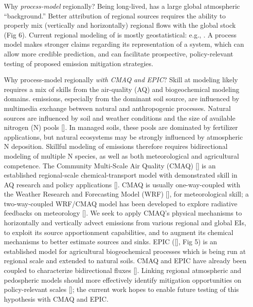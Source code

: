 \documentclass{a0poster} %
\begin{document}
\begin{textblock}{45}
        {\color{Red}Why \textit{process-model}  regionally?} Being long-lived,  has a large global atmospheric ``background.'' Better attribution of regional sources requires the ability to properly mix (vertically and horizontally) regional flows with the global stock (Fig 6). Current regional modeling of  is mostly geostatistical: e.g., \citet{miller_regional_2012}. A process model makes stronger claims regarding its representation of a system, which can allow more credible prediction, and can facilitate prospective, policy-relevant testing of proposed emission mitigation strategies.

        {\color{Red} Why process-model  regionally \textit{with CMAQ and EPIC}?} Skill at modeling  likely requires a mix of skills from the air-quality (AQ) and biogeochemical modeling domains.  emissions, especially from the dominant soil source, are influenced by multimedia exchange between natural and anthropogenic processes. Natural sources are influenced by soil and weather conditions and the size of available nitrogen (N) pools [\citet{smith_effects_1998}]. In managed soils, these pools are dominated by fertilizer applications, but natural ecosystems may be strongly influenced by atmospheric N deposition. Skillful modeling of  emissions therefore requires bidirectional modeling of multiple N species, as well as both meteorological and agricultural competence. The Community Multi-Scale Air Quality (CMAQ) [\citet{byun_review_2006}] is an established regional-scale chemical-transport model with demonstrated skill in AQ research and policy applications [\citet{foley_CMAQ_47_2010}]. CMAQ is usually one-way-coupled with the Weather Research and Forecasting Model (WRF) [\citet{skamarock_description_2005}], for meteorological skill; a two-way-coupled WRF/CMAQ model has been developed to explore radiative feedbacks on meteorology [\citet{wong_WRF_CMAQ_2012}]. We seek to apply CMAQ's physical mechanisms to horizontally and vertically advect  emissions from various regional and global EIs, to exploit its source apportionment capabilities, and to augment its chemical mechanisms to better estimate  sources and sinks. EPIC ([\citet{texas_agrilife_blackland_research_and_extension_center_epic_2011}], Fig 5) is an established model for agricultural biogeochemical processes which is being run at regional scale and extended to natural soils. CMAQ and EPIC have already been coupled to characterize bidirectional  fluxes [\citet{cooter_linking_2012}]. {\color{Red}Linking regional atmospheric and pedospheric models should more effectively identify  mitigation opportunities on policy-relevant scales} [\citet{olander_using_2011}]; the current work hopes to enable future testing of this hypothesis with CMAQ and EPIC.


\end{textblock}
\end{document}
